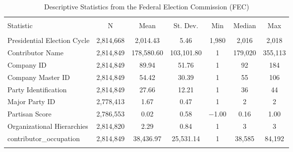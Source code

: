 
\begin{table}[!htbp] \centering 
  \caption{Descriptive Statistics from the Federal Election Commission (FEC)} 
  \label{} 
\scriptsize 
\begin{tabular}{@{\extracolsep{5pt}}lcccccc} 
\\[-1.8ex]\hline 
\hline \\[-1.8ex] 
Statistic & \multicolumn{1}{c}{N} & \multicolumn{1}{c}{Mean} & \multicolumn{1}{c}{St. Dev.} & \multicolumn{1}{c}{Min} & \multicolumn{1}{c}{Median} & \multicolumn{1}{c}{Max} \\ 
\hline \\[-1.8ex] 
Presidential Election Cycle & 2,814,668 & 2,014.43 & 5.46 & 1,980 & 2,016 & 2,018 \\ 
Contributor Name & 2,814,849 & 178,580.60 & 103,101.80 & 1 & 179,020 & 355,113 \\ 
Company ID & 2,814,849 & 89.94 & 51.76 & 1 & 92 & 184 \\ 
Company Master ID & 2,814,849 & 54.42 & 30.39 & 1 & 55 & 106 \\ 
Party Identification & 2,814,849 & 27.66 & 12.21 & 1 & 36 & 44 \\ 
Major Party ID & 2,778,413 & 1.67 & 0.47 & 1 & 2 & 2 \\ 
Partisan Score & 2,786,553 & 0.02 & 0.58 & $-$1.00 & 0.16 & 1.00 \\ 
Organizational Hierarchies & 2,814,820 & 2.29 & 0.84 & 1 & 3 & 3 \\ 
contributor\_occupation & 2,814,849 & 38,436.97 & 25,531.14 & 1 & 38,585 & 84,192 \\ 
\hline \\[-1.8ex] 
\end{tabular} 
\end{table}  
